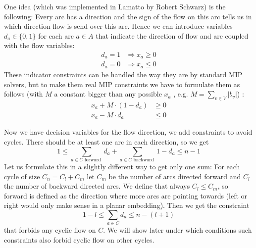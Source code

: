 One idea (which was implemented in Lamatto by Robert Schwarz) is the following: Every arc has a direction and the sign 
of the flow on this arc tells us in which direction flow is send over this arc. Hence we can introduce variables 
$d_a\in 
\{0,1\}$ for each arc $a\in A$ that indicate the direction of flow and are coupled with the flow variables:
\begin{align*}
d_a=1 & \Rightarrow x_a\ge 0 \\
d_a=0 & \Rightarrow x_a\le 0
\end{align*}
These indicator constraints can be handled the way they are by standard MIP solvers, but to make them real MIP 
constraints we have to formulate them as follows (with $M$ a constant bigger than any possible $x_a$ , e.g. 
$M=\sum_{v\in V}|b_v|$) :
\begin{align*}
 x_a + M\cdot (1-d_a) &\ge 0\\
 x_a - M\cdot d_a & \le 0
\end{align*}



Now we have decision variables for the flow direction, we add constraints to avoid cycles. There should be at least 
one arc in each direction, so we get $$ 1\le\sum_{a\in C\textrm{ forward }} d_a + \sum_{a\in C\textrm{ backward 
}}1-d_a\le n-1$$
Let us formulate this in a slightly different way to get only one sum: For each cycle of size $C_n=C_l+C_m$ 
let $C_m$ be the number of arcs directed forward and $C_l$ the number of backward directed arcs. We define that always 
$C_l\le C_m$, so forward is defined as the direction where more arcs are pointing towards (left or right would only 
make 
sense in a planar embedding). Then we get the constraint $$1-l \le \sum_{a\in C}d_a\le n-(l+1)$$ that forbids any
cyclic flow on $C$. We will show later under which conditions such constraints also forbid cyclic flow on other cycles. 

